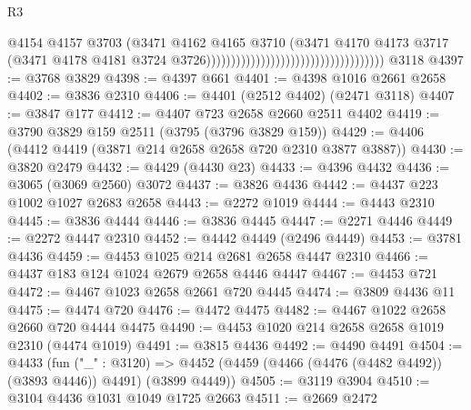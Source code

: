 \begin{lexlean}{R3}
\begin{coremodule}
                                                                      @4154
                                                                      @4157
                                                                      @3703
                                                                      (@3471
                                                                        @4162
                                                                        @4165
                                                                        @3710
                                                                        (@3471
                                                                          @4170
                                                                          @4173
                                                                          @3717
                                                                          (@3471
                                                                            @4178
                                                                            @4181
                                                                            @3724
                                                                            @3726))))))))))))))))))))))))))))))))))))
    @3118
@4397 := @3768 @3829
@4398 := @4397 @661
@4401 := @4398 @1016 @2661 @2658
@4402 := @3836 @2310
@4406 := @4401 (@2512 @4402) (@2471 @3118)
@4407 := @3847 @177
@4412 := @4407 @723 @2658 @2660 @2511 @4402
@4419 := @3790 @3829 @159 @2511 (@3795 (@3796 @3829 @159))
@4429 := @4406 (@4412 @4419 (@3871 @214 @2658 @2658 @720 @2310 @3877 @3887))
@4430 := @3820 @2479
@4432 := @4429 (@4430 @23)
@4433 := @4396 @4432
@4436 := @3065 (@3069 @2560) @3072
@4437 := @3826 @4436
@4442 := @4437 @223 @1002 @1027 @2683 @2658
@4443 := @2272 @1019
@4444 := @4443 @2310
@4445 := @3836 @4444
@4446 := @3836 @4445
@4447 := @2271 @4446
@4449 := @2272 @4447 @2310
@4452 := @4442 @4449 (@2496 @4449)
@4453 := @3781 @4436
@4459 := @4453 @1025 @214 @2681 @2658 @4447 @2310
@4466 := @4437 @183 @124 @1024 @2679 @2658 @4446 @4447
@4467 := @4453 @721
@4472 := @4467 @1023 @2658 @2661 @720 @4445
@4474 := @3809 @4436 @11
@4475 := @4474 @720
@4476 := @4472 @4475
@4482 := @4467 @1022 @2658 @2660 @720 @4444 @4475
@4490 := @4453 @1020 @214 @2658 @2658 @1019 @2310 (@4474 @1019)
@4491 := @3815 @4436
@4492 := @4490 @4491
@4504 := @4433
    (fun ("_" : @3120) =>
    @4452 (@4459 (@4466 (@4476 (@4482 @4492)) (@3893 @4446)) @4491) (@3899 @4449))
@4505 := @3119 @3904
@4510 := @3104 @4436 @1031 @1049 @1725 @2663
@4511 := @2669 @2472

\end{coremodule}
\end{lexlean}
